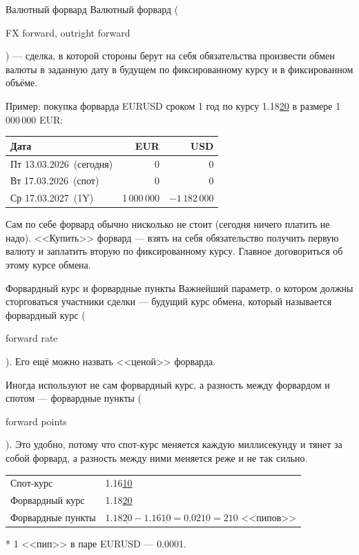 \documentclass{beamer}
\newcommand{\en}[1]{\begin{otherlanguage}{english}#1\end{otherlanguage}}
\newcommand{\eurusdBigFigures}{1.16}
\newcommand{\eurusdBigFiguresPlusTwo}{1.18}
\newcommand{\eurusdBigFiguresPlusTwoPerMillion}{1\,18}
\newcommand{\eurusdBusinessDate}{Пт 13.03.2026}
\newcommand{\eurusdSpotDate}{Вт 17.03.2026}
\newcommand{\eurusdOneYearDate}{Ср 17.03.2027}
\begin{document}
\begin{frame}{Валютный форвард}
\justify
\alert{Валютный форвард} (\en{FX forward, outright forward}) --- сделка, в которой стороны берут 
на себя обязательства произвести обмен валюты в заданную дату в будущем по 
фиксированному курсу и в фиксированном объёме. 

\justify
Пример: покупка форварда EURUSD сроком 1 год по курсу \eurusdBigFiguresPlusTwo\underline{20} в размере 1\,000\,000 EUR:

\centering
\begin{tabular}{l|r|r}
Дата                          & EUR & USD \\ \hline
\eurusdBusinessDate\ (сегодня)  & 0   & 0   \\
\eurusdSpotDate\ (спот) & 0   & 0   \\
\eurusdOneYearDate\ (1Y)   & 1\,000\,000 & $-\eurusdBigFiguresPlusTwoPerMillion 2\,000$
\end{tabular}

\justify
Сам по себе форвард обычно нисколько не стоит (сегодня ничего платить не надо). <<Купить>> форвард --- взять на себя обязательство получить первую валюту и заплатить вторую по фиксированному курсу. Главное договориться об этому курсе обмена.
\end{frame}



\begin{frame}{Форвардный курс и форвардные пункты}
\justify
Важнейший параметр, о котором должны сторговаться участники сделки --- будущий курс обмена, который называется \alert{форвардный курс} (\en{forward rate}). Его ещё можно назвать <<ценой>> форварда.

\justify
Иногда используют не сам форвардный курс, а разность между форвардом и спотом --- \alert{форвардные пункты} (\en{forward points}). Это удобно, потому что спот-курс меняется каждую миллисекунду и тянет за собой форвард, а разность между ними меняется реже и не так сильно.

\vspace{\baselineskip}
\centering
\begin{tabular}{l|l}
Спот-курс & \eurusdBigFigures\underline{10} \\
Форвардный курс & \eurusdBigFiguresPlusTwo\underline{20} \\
\hline
Форвардные пункты & $\eurusdBigFiguresPlusTwo\underline{20} - \eurusdBigFigures\underline{10} = 0.02\underline{10 }= 210$ <<пипов>>
\end{tabular}

\justify
* 1 <<пип>> в паре EURUSD --- 0.0001.
\end{frame}
\end{document}
